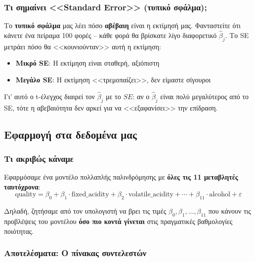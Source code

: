 \documentclass[12pt,a4paper]{article}
\begin{document}
\subsubsection{Τι σημαίνει <<Standard Error>> (τυπικό σφάλμα);}

\begin{theorybox}
Το \textbf{τυπικό σφάλμα} μας λέει πόσο \textbf{αβέβαιη} είναι η εκτίμησή μας. Φανταστείτε ότι κάνετε ένα πείραμα 100 φορές -- κάθε φορά θα βρίσκατε λίγο διαφορετικό $\hat{\beta}_j$. Το SE μετράει πόσο θα <<κουνιούνταν>> αυτή η εκτίμηση:

\begin{itemize}
    \item \textbf{Μικρό SE}: Η εκτίμηση είναι σταθερή, αξιόπιστη
    \item \textbf{Μεγάλο SE}: Η εκτίμηση <<τρεμοπαίζει>>, δεν είμαστε σίγουροι
\end{itemize}

Γι' αυτό ο t-έλεγχος διαιρεί τον $\hat{\beta}_j$ με το $SE$: αν ο $\hat{\beta}_j$ είναι πολύ μεγαλύτερος από το SE, τότε η αβεβαιότητα δεν αρκεί για να <<εξαφανίσει>> την επίδραση.
\end{theorybox}

\subsection{Εφαρμογή στα δεδομένα μας}

\subsubsection{Τι ακριβώς κάναμε}

Εφαρμόσαμε ένα μοντέλο πολλαπλής παλινδρόμησης με \textbf{όλες τις 11 μεταβλητές ταυτόχρονα}:
$$\text{quality} = \beta_0 + \beta_1 \cdot \text{fixed\_acidity} + \beta_2 \cdot \text{volatile\_acidity} + \cdots + \beta_{11} \cdot \text{alcohol} + \varepsilon$$

Δηλαδή, ζητήσαμε από τον υπολογιστή να βρει τις τιμές $\beta_0, \beta_1, \ldots, \beta_{11}$ που κάνουν τις προβλέψεις του μοντέλου \textbf{όσο πιο κοντά γίνεται} στις πραγματικές βαθμολογίες ποιότητας.

\subsubsection{Αποτελέσματα: Ο πίνακας συντελεστών}
\end{document}
